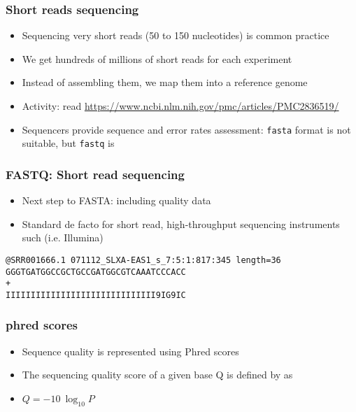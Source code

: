 \documentclass{beamer}
\begin{document}
\begin{frame}
  \frametitle{Short reads sequencing}
  \begin{itemize}
  \item Sequencing very short reads (50 to 150 nucleotides) is common practice
  \item We get hundreds of millions of short reads for each experiment
  \item Instead of assembling them, we map them into a reference genome
  \item Activity: read \url{https://www.ncbi.nlm.nih.gov/pmc/articles/PMC2836519/}
  \item Sequencers provide sequence and error rates assessment: \texttt{fasta} format is not suitable, but \texttt{fastq} is
  \end{itemize}
\end{frame}


\begin{frame}[fragile]
  \frametitle{FASTQ: Short read sequencing}
  \begin{itemize}
  \item Next step to FASTA: including quality data
  \item Standard de facto for short read, high-throughput sequencing instruments such (i.e. Illumina)
  \end{itemize}


\begin{verbatim}
@SRR001666.1 071112_SLXA-EAS1_s_7:5:1:817:345 length=36
GGGTGATGGCCGCTGCCGATGGCGTCAAATCCCACC
+
IIIIIIIIIIIIIIIIIIIIIIIIIIIIII9IG9IC
\end{verbatim}


\end{frame}


\begin{frame}
  \frametitle{phred scores}
  \begin{itemize}
  \item Sequence quality is represented using Phred scores
  \item The sequencing quality score of a given base Q is defined by as
  \item $Q = -10 \ \log_{10} P$
  \end{itemize}
\end{frame}
\end{document}
